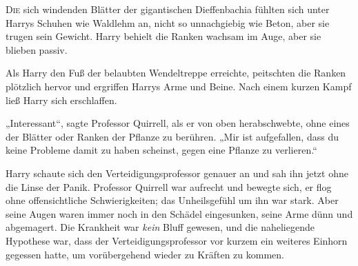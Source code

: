 
\lettrine{D}{ie} sich windenden Blätter der gigantischen Dieffenbachia fühlten sich unter Harrys Schuhen wie Waldlehm an, nicht so unnachgiebig wie Beton, aber sie trugen sein Gewicht. Harry behielt die Ranken wachsam im Auge, aber sie blieben passiv.

Als Harry den Fuß der belaubten Wendeltreppe erreichte, peitschten die Ranken plötzlich hervor und ergriffen Harrys Arme und Beine. Nach einem kurzen Kampf ließ Harry sich erschlaffen.

„Interessant“, sagte Professor Quirrell, als er von oben herabschwebte, ohne eines der Blätter oder Ranken der Pflanze zu berühren. „Mir ist aufgefallen, dass du keine Probleme damit zu haben scheinst, gegen eine Pflanze zu verlieren.“

Harry schaute sich den Verteidigungsprofessor genauer an und sah ihn jetzt ohne die Linse der Panik. Professor Quirrell war aufrecht und bewegte sich, er flog ohne offensichtliche Schwierigkeiten; das Unheilsgefühl um ihn war stark. Aber seine Augen waren immer noch in den Schädel eingesunken, seine Arme dünn und abgemagert. Die Krankheit war \emph{kein} Bluff gewesen, und die naheliegende Hypothese war, dass der Verteidigungsprofessor vor kurzem ein weiteres Einhorn gegessen hatte, um vorübergehend wieder zu Kräften zu kommen.

